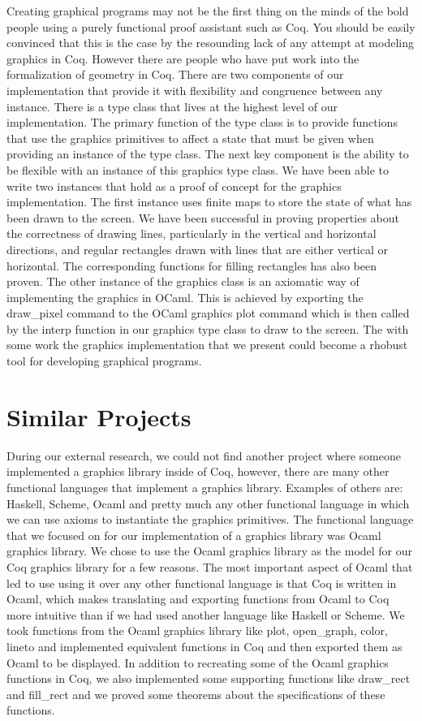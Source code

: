 \documentclass{llncs}
\begin{document}
Creating graphical programs may not be the first thing on the minds of the bold people using a purely functional proof assistant such as Coq.
You should be easily convinced that this is the case by the resounding lack of any attempt at modeling graphics in Coq.  However there are people
who have put work into the formalization of geometry in Coq. There are two components of our implementation that provide it with flexibility and congruence between any instance. There is a type class that lives at the highest level of our implementation.  The primary function of the type class is to provide functions that use the graphics primitives to affect a state that must be given when providing an instance of the type class. The next key component is the ability to be flexible with an instance of this graphics type class.  We have been able to write two instances that hold as a proof of concept for the graphics implementation.  The first instance uses finite maps to store the state of what has been drawn to the screen.  We have been successful in proving properties about the correctness of drawing lines, particularly in the vertical and horizontal directions, and regular rectangles drawn with lines that are either vertical or horizontal.  The corresponding functions for filling rectangles has also been proven.  The other instance of the graphics class is an axiomatic way of implementing the graphics in OCaml.  This is achieved by exporting the draw\_pixel command to the OCaml graphics plot command which is then called by the interp function in our graphics type class to draw to the screen.
The with some work the graphics implementation that we present could become a rhobust tool for developing graphical programs.

\section{Similar Projects}
During our external research, we could not find another project where someone
implemented a graphics library inside of Coq, however, there are many other
functional languages that implement a graphics library. Examples of others
are: Haskell, Scheme, Ocaml and pretty much any other functional language in
which we can use axioms to instantiate the graphics primitives. The functional
language that we focused on for our implementation of a graphics library was
Ocaml graphics library. We chose to use the Ocaml graphics library as the
model for our Coq graphics library for a few reasons. The most important
aspect of Ocaml that led to use using it over any other functional language is
that Coq is written in Ocaml, which makes translating and exporting functions
from Ocaml to Coq more intuitive than if we had used another language like
Haskell or Scheme. We took functions from the Ocaml graphics library like plot,
open\_graph, color, lineto and implemented equivalent functions in Coq and
then exported them as Ocaml to be displayed. In addition to recreating some
of the Ocaml graphics functions in Coq, we also implemented some supporting
functions like draw\_rect and fill\_rect and we proved some theorems about the
specifications of these functions.
\end{document}
